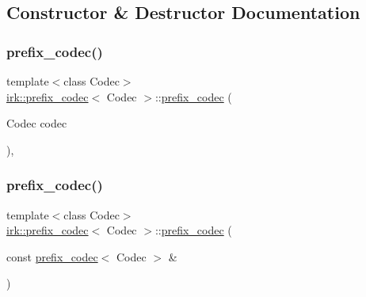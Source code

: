\subsection{Constructor \& Destructor Documentation}
\mbox{\label{classirk_1_1prefix__codec_ae62df61eb37ba33832925eccd5c34bff}} 
\subsubsection{\texorpdfstring{prefix\+\_\+codec()}{prefix\_codec()}\hspace{0.1cm}{\footnotesize\ttfamily [1/3]}}
{\footnotesize\ttfamily template$<$class Codec$>$ \\
\mbox{\hyperlink{classirk_1_1prefix__codec}{irk\+::prefix\+\_\+codec}}$<$ Codec $>$\+::\mbox{\hyperlink{classirk_1_1prefix__codec}{prefix\+\_\+codec}} (\begin{DoxyParamCaption}\item[{Codec}]{codec }\end{DoxyParamCaption})\hspace{0.3cm}{\ttfamily [inline]}, {\ttfamily [explicit]}}

\mbox{\label{classirk_1_1prefix__codec_ac722dba7a56035e5a7504fe974c033b6}} 
\subsubsection{\texorpdfstring{prefix\+\_\+codec()}{prefix\_codec()}\hspace{0.1cm}{\footnotesize\ttfamily [2/3]}}
{\footnotesize\ttfamily template$<$class Codec$>$ \\
\mbox{\hyperlink{classirk_1_1prefix__codec}{irk\+::prefix\+\_\+codec}}$<$ Codec $>$\+::\mbox{\hyperlink{classirk_1_1prefix__codec}{prefix\+\_\+codec}} (\begin{DoxyParamCaption}\item[{const \mbox{\hyperlink{classirk_1_1prefix__codec}{prefix\+\_\+codec}}$<$ Codec $>$ \&}]{ }\end{DoxyParamCaption})\hspace{0.3cm}{\ttfamily [default]}}

